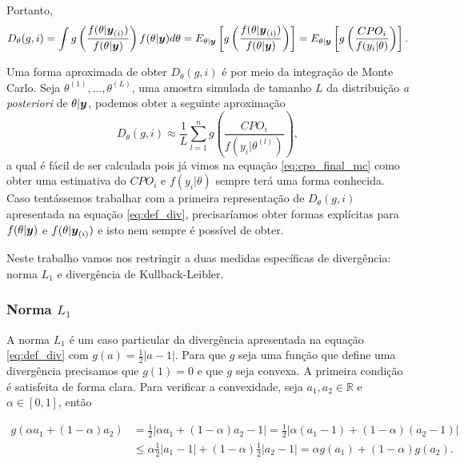 Portanto,
\begin{equation}
D_\theta(g,i)=\int g\left(\frac{f(\theta|{\boldsymbol{y}_{(i)}})}{f(\theta|{\boldsymbol{y}})}\right)f(\theta|{\boldsymbol{y}}) d\theta = E_{\theta|{\boldsymbol{y}}}\left[g\left(\frac{f(\theta|{\boldsymbol{y}_{(i)}})}{f(\theta|{\boldsymbol{y}})}\right)\right]= E_{\theta|{\boldsymbol{y}}}\left[g\left(\frac{CPO_i}{f(y_i|\theta)}\right)\right].
\end{equation}

Uma forma aproximada de obter $D_\theta(g,i)$ é por meio da integração de Monte Carlo. Seja $\theta^{(1)},\ldots,\theta^{(L)}$, uma amostra simulada de tamanho $L$ da distribuição \textit{a posteriori} de $\theta|{\boldsymbol{y}}$, podemos obter a seguinte aproximação
\begin{equation}\label{eq:div_glo_final}
D_\theta(g,i)\approx \frac{1}{L}\sum_{l=1}^ng\left(\frac{CPO_i}{f(y_i|\theta^{(l)})}\right),
\end{equation}
a qual é fácil de ser calculada pois já vimos na equação \eqref{eq:cpo_final_mc} como obter uma estimativa do $CPO_i$ e $f(y_i|\theta)$ sempre terá uma forma conhecida. Caso tentássemos trabalhar com a primeira representação de $D_\theta(g,i)$ apresentada na equação \eqref{eq:def_div}, precisaríamos obter formas explícitas para $f(\theta|{\boldsymbol{y}})$ e $f(\theta|{\boldsymbol{y}_{(i)}})$ e isto nem sempre é possível de obter.

Neste trabalho vamos nos restringir a duas medidas específicas de divergência: norma $L_1$ e divergência de Kullback-Leibler.

\subsubsection{Norma $L_1$}
A norma $L_1$ é um caso particular da divergência apresentada na equação \eqref{eq:def_div} com $g(a) = \frac{1}{2}|a-1|$. Para que $g$ seja uma função que define uma divergência precisamos que $g(1)=0$ e que $g$ seja convexa. A primeira condição é satisfeita de forma clara. Para verificar a convexidade, seja $a_1,a_2\in \mathbb{R}$ e $\alpha\in [0,1]$, então

\begin{equation}
\begin{split}
g(\alpha a_1+(1-\alpha)a_2) &= \frac{1}{2}|\alpha a_1+(1-\alpha)a_2-1| = \frac{1}{2}|\alpha(a_1-1)+(1-\alpha)(a_2-1)| \\
{} & \leqslant \alpha\frac{1}{2}|a_1-1|+(1-\alpha)\frac{1}{2}|a_2-1| = \alpha g(a_1) + (1-\alpha)g(a_2).
\end{split}
\end{equation}

